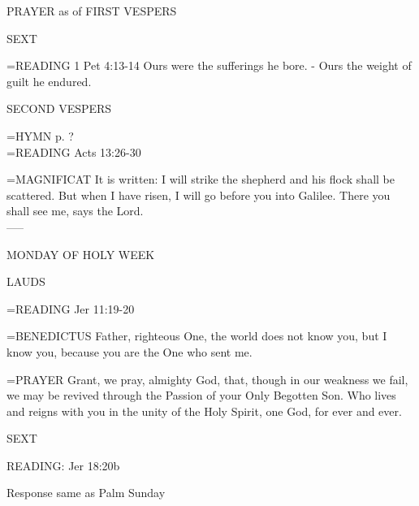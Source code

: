 \begin{flushleft}\normalsize PRAYER as of FIRST VESPERS\\\end{flushleft}

\begin{flushleft}\normalsize SEXT\\\end{flushleft}
\hangindent=\parindent \small{READING}    1 Pet 4:13-14 \textbf{   }
Ours were the sufferings he bore.
- Ours the weight of guilt he endured.

\begin{flushleft}\normalsize SECOND VESPERS\\\end{flushleft}
\hangindent=\parindent \small{\uppercase{HYMN} p.  ?\\}
\hangindent=\parindent \small{READING}    Acts 13:26-30 \textbf{   \\}

\hangindent=\parindent \small{MAGNIFICAT 	It is written: I will strike the shepherd and his flock shall be scattered. But when I have risen, I will go before you into Galilee. There you shall see me, says the Lord.\\}
-----
\begin{center}
\normalsize MONDAY OF HOLY WEEK
\end{center}

\begin{flushleft}\normalsize LAUDS\\\end{flushleft}
\hangindent=\parindent \small{READING}    Jer 11:19-20 \textbf{   \\}

\hangindent=\parindent \small{BENEDICTUS 	Father, righteous One, the world does not know you, but I know you, because you are the One who sent me.\\}

\hangindent=\parindent \small{PRAYER 	Grant, we pray, almighty God, that, though in our weakness we fail, we may be revived through the Passion of your Only Begotten Son. Who lives and reigns with you in the unity of the Holy Spirit, one God, for ever and ever.}

\begin{flushleft}\normalsize SEXT\\\end{flushleft}
READING:    Jer 18:20b

Response same as Palm Sunday

